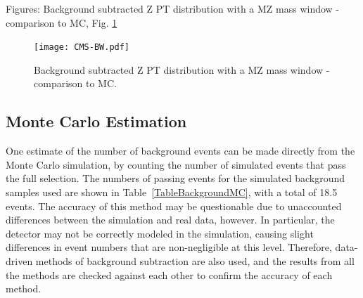 Figures: Background subtracted Z PT distribution with a MZ mass window - comparison to MC, Fig. \ref{fig:YieldVsZPtComparedToMC}

 \begin{figure}[htb]
  \begin{center}
    \texttt{[image: CMS-BW.pdf]}
  \end{center}
  \caption[Background subtracted Z PT distribution with a MZ mass window - comparison to MC]{Background subtracted Z PT distribution with a MZ mass window - comparison to MC.}
  \label{fig:YieldVsZPtComparedToMC}
 \end{figure}

\subsection{Monte Carlo Estimation}
\label{anMeth:BGSubMC}
One estimate of the number of background events can be made 
directly from the Monte Carlo simulation, 
by counting the number of simulated events that pass 
the full selection.  
The numbers of passing events for the simulated background 
samples used are shown in Table~\ref{TableBackgroundMC}, 
with a total of 18.5 events.  
The accuracy of this method may be questionable due to 
unaccounted differences between the simulation and real data, however.  
In particular, 
the detector may not be correctly modeled in the simulation, 
causing slight differences in event numbers 
that are non-negligible at this level.  
Therefore, data-driven methods of background subtraction 
are also used, 
and the results from all the methods are checked against each other 
to confirm the accuracy of each method.  


